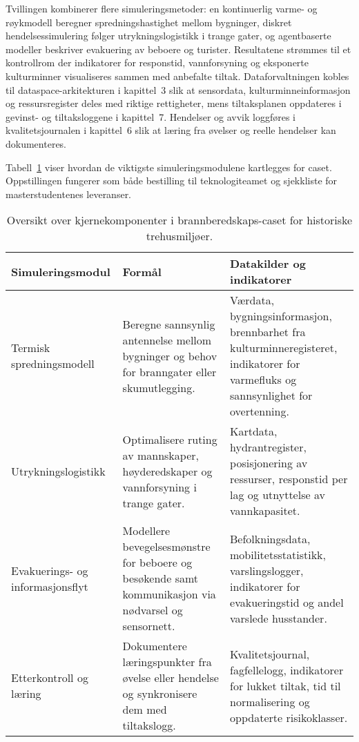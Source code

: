 Tvillingen kombinerer flere simuleringsmetoder: en kontinuerlig varme- og røykmodell beregner spredningshastighet mellom bygninger, diskret hendelsessimulering følger utrykningslogistikk i trange gater, og agentbaserte modeller beskriver evakuering av beboere og turister. Resultatene strømmes til et kontrollrom der indikatorer for responstid, vannforsyning og eksponerte kulturminner visualiseres sammen med anbefalte tiltak. Dataforvaltningen kobles til dataspace-arkitekturen i kapittel~3 slik at sensordata, kulturminneinformasjon og ressursregister deles med riktige rettigheter, mens tiltaksplanen oppdateres i gevinst- og tiltaksloggene i kapittel~7. Hendelser og avvik loggføres i kvalitetsjournalen i kapittel~6 slik at læring fra øvelser og reelle hendelser kan dokumenteres.

Tabell~\ref{tab:kap04-brann-simulering} viser hvordan de viktigste simuleringsmodulene kartlegges for caset. Oppstillingen fungerer som både bestilling til teknologiteamet og sjekkliste for masterstudentenes leveranser.

\begin{table}[htbp]
    \centering
    \begin{tabular}{p{}p{}p{}}
        \toprule
        \textbf{Simuleringsmodul} & \textbf{Formål} & \textbf{Datakilder og indikatorer}\\
        \midrule
        Termisk spredningsmodell & Beregne sannsynlig antennelse mellom bygninger og behov for branngater eller skumutlegging. & Værdata, bygningsinformasjon, brennbarhet fra kulturminneregisteret, indikatorer for varmefluks og sannsynlighet for overtenning.\\
        Utrykningslogistikk & Optimalisere ruting av mannskaper, høyderedskaper og vannforsyning i trange gater. & Kartdata, hydrantregister, posisjonering av ressurser, responstid per lag og utnyttelse av vannkapasitet.\\
        Evakuerings- og informasjonsflyt & Modellere bevegelsesmønstre for beboere og besøkende samt kommunikasjon via nødvarsel og sensornett. & Befolkningsdata, mobilitetsstatistikk, varslingslogger, indikatorer for evakueringstid og andel varslede husstander.\\
        Etterkontroll og læring & Dokumentere læringspunkter fra øvelse eller hendelse og synkronisere dem med tiltakslogg. & Kvalitetsjournal, fagfellelogg, indikatorer for lukket tiltak, tid til normalisering og oppdaterte risikoklasser.\\
        \bottomrule
    \end{tabular}
    \caption{Oversikt over kjernekomponenter i brannberedskaps-caset for historiske trehusmiljøer.}
    \label{tab:kap04-brann-simulering}
\end{table}

